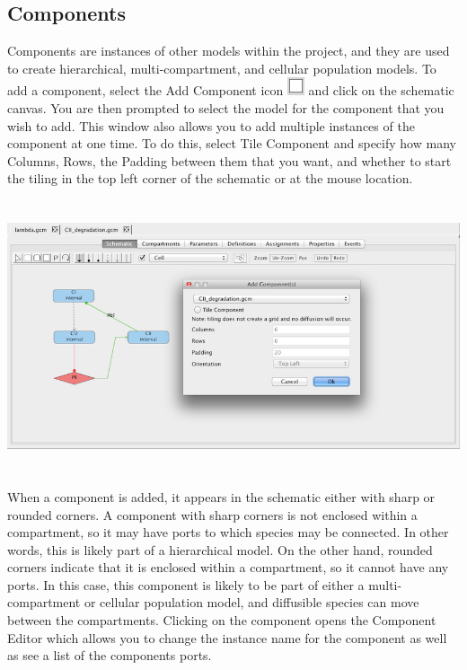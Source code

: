 \documentclass[titlepage,11pt]{article}
\begin{document}
\subsection{\label{Components}Components}

\noindent
Components are instances of other models within the project, and they are used to create hierarchical, multi-compartment, and cellular population models.  To add a component, select the Add Component icon \includegraphics{../gui/icons/modelview/add_component_selected} and click on the schematic canvas.  You are then prompted to select the model for the component that you wish to add.  This window also allows you to add multiple instances of the component at one time.  To do this, select Tile Component and specify how many Columns, Rows, the Padding between them that you want, and whether to start the tiling in the top left corner of the schematic or at the mouse location.  

\begin{center}
\includegraphics[height=80mm]{screenshots/addComponent}
\end{center}

When a component is added, it appears in the schematic either with sharp or rounded corners.  A component with sharp corners is not enclosed within a compartment, so it may have ports to which species may be connected.  In other words, this is likely part of a hierarchical model.  On the other hand, rounded corners indicate that it is enclosed within a compartment, so it cannot have any ports.  In this case, this component is likely to be part of either a multi-compartment or cellular population model, and diffusible species can move between the compartments.  Clicking on the component opens the Component Editor which allows you to change the instance name for the component as well as see a list of the components ports.
\end{document}
